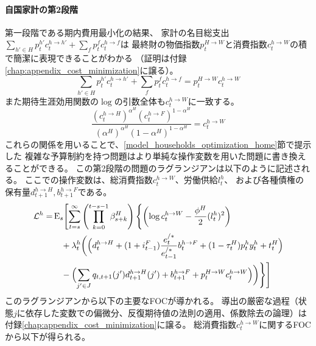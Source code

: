 \paragraph{自国家計の第2段階}
\label{sec:model_households_indices_aggregation_stage2_home}
第一段階である期内費用最小化の結果、
家計の名目総支出\(\sum_{h'\in H}p_t^{h'}c_t^{h\to h'}+\sum_fp_t^fc_t^{h\to f}\)は
最終財の物価指数\(p_t^{H\to W}\)と消費指数\(c_t^{h\to W}\)の積で簡潔に表現できることがわかる
（証明は付録\ref{chap:appendix_cost_minimization}に譲る）。
\begin{equation}
\label{form:model_households_indices_aggregation_stage2_home_p_H_W_c_h_W_eq}
    \sum_{h'\in H}p_t^{h'}c_t^{h\to h'}+\sum_fp_t^fc_t^{h\to f}=p_t^{H\to W}c_t^{h\to W}
\end{equation}
また期待生涯効用関数の\(\log\)の引数全体も\(c_t^{h\to W}\)に一致する。
\begin{equation}
\label{form:model_households_indices_aggregation_stage2_home_c_h_W_eq}
    \frac{(c_t^{h\to H})^{\alpha^H}(c_t^{h\to F})^{1-\alpha^H}}{(\alpha^H)^{\alpha^H}(1-\alpha^H)^{1-\alpha^H}}=c_t^{h\to W}
\end{equation}
これらの関係を用いることで、\ref{model_households_optimization_home}節で提示した
複雑な予算制約を持つ問題はより単純な操作変数を用いた問題に書き換えることができる。
この第2段階の問題のラグランジアンは以下のように記述される。
ここでの操作変数は、総消費指数\(c_t^{h\to W}\)、労働供給\(l_t^h\)、
および各種債権の保有量\(d_{t+1}^{h\to H},b_{t+1}^{h\to F}\)である。
\begin{equation}
\label{form:model_households_indices_aggregation_stage2_home_lagrangian_eq}
    \begin{aligned}
        \mathcal{L}^h=&\operatorname{E}_s\Biggl[\sum_{t=s}^{\infty}\left(\prod_{k=0}^{t-s-1}\beta_{s+k}^H\right)\Biggl\{\left(\log c_t^{h\to W}-\frac{\phi^H}{2}(l_t^h)^2\right) \\
        &\quad+\lambda_t^h\biggl(\Bigl(d_t^{h\to H}+(1+i_{t-1}^F)\frac{e_t^{/*}}{e_{t-1}^{/*}}b_t^{h\to F}+(1-\tau_t^H)p_t^hy_t^h+t_t^H\Bigr) \\
        &\quad-\Bigl(\sum_{j'\in J}q_{t,t+1}(j')d_{t+1}^{h\to H}(j')+b_{t+1}^{h\to F}+p_t^{H\to W}c_t^{h\to W}\Bigr)\biggr)\Biggr\}\Biggr]
    \end{aligned}
\end{equation}
このラグランジアンから以下の主要なFOCが導かれる。
導出の厳密な過程（状態\(j\)に依存した変数での偏微分、反復期待値の法則の適用、係数除去の論理）は
付録\ref{chap:appendix_cost_minimization}に譲る。
総消費指数\(c_t^{h\to W}\)に関するFOCから以下が得られる。
